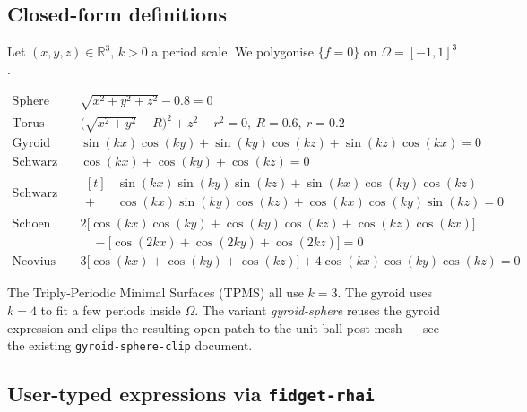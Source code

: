 \documentclass[11pt]{article}
\begin{document}
\subsection{Closed-form definitions}

Let $(x,y,z)\in\mathbb{R}^3$, $k>0$ a period scale.  We polygonise
$\{f=0\}$ on $\Omega=[-1,1]^3$.

\begin{align}
  \text{Sphere} \quad &
    \sqrt{x^2+y^2+z^2} - 0.8 = 0
    \\[2pt]
  \text{Torus} \quad &
    \bigl(\sqrt{x^2+y^2}-R\bigr)^2 + z^2 - r^2 = 0,
    \ R{=}0.6,\ r{=}0.2
    \\[2pt]
  \text{Gyroid} \quad &
    \sin(kx)\cos(ky) + \sin(ky)\cos(kz) + \sin(kz)\cos(kx) = 0
    \\[2pt]
  \text{Schwarz P} \quad &
    \cos(kx)+\cos(ky)+\cos(kz) = 0
    \\[2pt]
  \text{Schwarz D} \quad &
    \begin{aligned}[t]
    & \sin(kx)\sin(ky)\sin(kz) + \sin(kx)\cos(ky)\cos(kz) \\
    +\,& \cos(kx)\sin(ky)\cos(kz) + \cos(kx)\cos(ky)\sin(kz) = 0
    \end{aligned}
    \\[2pt]
  \text{Schoen IWP} \quad &
    2\bigl[\cos(kx)\cos(ky)+\cos(ky)\cos(kz)+\cos(kz)\cos(kx)\bigr] \nonumber\\
    &\quad - \bigl[\cos(2kx)+\cos(2ky)+\cos(2kz)\bigr] = 0
    \\[2pt]
  \text{Neovius} \quad &
    3\bigl[\cos(kx)+\cos(ky)+\cos(kz)\bigr]
    + 4\cos(kx)\cos(ky)\cos(kz) = 0
\end{align}

\noindent
The Triply-Periodic Minimal Surfaces (TPMS) all use $k=3$.  The gyroid
uses $k=4$ to fit a few periods inside $\Omega$.  The variant
\textit{gyroid-sphere} reuses the gyroid expression and clips the
resulting open patch to the unit ball post-mesh --- see the existing
\texttt{gyroid-sphere-clip} document.

\subsection{User-typed expressions via \texttt{fidget-rhai}}
\end{document}
